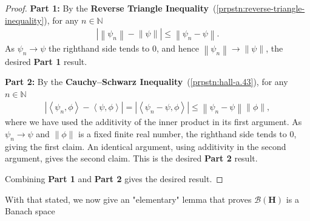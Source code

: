 \begin{proof}
    \leanok
\textbf{Part 1:} By the \textbf{Reverse Triangle Inequality}~(\ref{prpstn:reverse-triangle-inequality}), for any $n \in \mathbb{N}$
\begin{align}
    \left\lvert \left\| \psi_n \right\| - \left\| \psi \right\| \right\rvert \le \left\| \psi_n - \psi \right\|.
\end{align}
As $\psi_n \rightarrow \psi$ the righthand side tends to $0$, and hence $\left\| \psi_n \right\| \rightarrow \left\| \psi \right\|$, the desired \textbf{Part 1} result.

\textbf{Part 2:} By the \textbf{Cauchy–Schwarz Inequality}~(\ref{prpstn:hall-a.43}), for any $n \in \mathbb{N}$
\begin{align}
    \left\lvert \left< \psi_n, \phi \right> - \left< \psi, \phi \right> \right\rvert = \left\lvert \left< \psi_n - \psi, \phi \right> \right\rvert \le \left\| \psi_n - \psi \right\| \left\| \phi \right\|,
\end{align}
where we have used the additivity of the inner product in its first argument. As $\psi_n \rightarrow \psi$ and $\left\| \phi \right\|$ is a fixed finite real number, the righthand side tends to $0$, giving the first claim. An identical argument, using additivity in the second argument, gives the second claim. This is the desired \textbf{Part 2} result.

Combining \textbf{Part 1} and \textbf{Part 2} gives the desired result.
\end{proof}

With that stated, we now give an "elementary" lemma that proves $\mathcal{B}(\mathbf{H})$ is a Banach space

